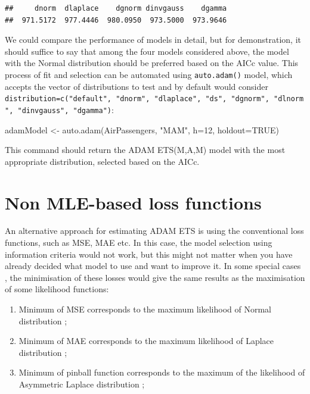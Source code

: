 \documentclass[
]{book}
\newenvironment{Shaded}{\begin{snugshade}}{\end{snugshade}}
\newcommand{\AttributeTok}[1]{\textcolor[rgb]{0.77,0.63,0.00}{#1}}
\newcommand{\ConstantTok}[1]{\textcolor[rgb]{0.00,0.00,0.00}{#1}}
\newcommand{\DecValTok}[1]{\textcolor[rgb]{0.00,0.00,0.81}{#1}}
\newcommand{\FunctionTok}[1]{\textcolor[rgb]{0.00,0.00,0.00}{#1}}
\newcommand{\NormalTok}[1]{#1}
\newcommand{\OtherTok}[1]{\textcolor[rgb]{0.56,0.35,0.01}{#1}}
\newcommand{\StringTok}[1]{\textcolor[rgb]{0.31,0.60,0.02}{#1}}
\providecommand{\tightlist}{%
  \setlength{\itemsep}{0pt}\setlength{\parskip}{0pt}}
\theoremstyle{definition}
\theoremstyle{definition}
\theoremstyle{definition}
\theoremstyle{definition}
\theoremstyle{remark}
\begin{document}
\begin{verbatim}
##     dnorm  dlaplace    dgnorm dinvgauss    dgamma 
##  971.5172  977.4446  980.0950  973.5000  973.9646
\end{verbatim}

We could compare the performance of models in detail, but for demonstration, it should suffice to say that among the four models considered above, the model with the Normal distribution should be preferred based on the AICc value. This process of fit and selection can be automated using \texttt{auto.adam()} model, which accepts the vector of distributions to test and by default would consider \texttt{distribution=c("default",\ "dnorm",\ "dlaplace",\ "ds",\ "dgnorm",\ "dlnorm",\ "dinvgauss",\ "dgamma")}:

\begin{Shaded}
\begin{Highlighting}[]
\NormalTok{adamModel }\OtherTok{\textless{}{-}} \FunctionTok{auto.adam}\NormalTok{(AirPassengers, }\StringTok{"MAM"}\NormalTok{, }\AttributeTok{h=}\DecValTok{12}\NormalTok{, }\AttributeTok{holdout=}\ConstantTok{TRUE}\NormalTok{)}
\end{Highlighting}
\end{Shaded}

This command should return the ADAM ETS(M,A,M) model with the most appropriate distribution, selected based on the AICc.

\hypertarget{non-mle-based-loss-functions}{%
\section{Non MLE-based loss functions}\label{non-mle-based-loss-functions}}

An alternative approach for estimating ADAM ETS is using the conventional loss functions, such as MSE, MAE etc. In this case, the model selection using information criteria would not work, but this might not matter when you have already decided what model to use and want to improve it. In some special cases \citep[as discussed in Chapter 3 of][]{SvetunkovSBA}, the minimisation of these losses would give the same results as the maximisation of some likelihood functions:

\begin{enumerate}
\def\labelenumi{\arabic{enumi}.}
\tightlist
\item
  Minimum of MSE corresponds to the maximum likelihood of Normal distribution \citep[see discussion in][]{Kolassa2016};
\item
  Minimum of MAE corresponds to the maximum likelihood of Laplace distribution \citep{Schwertman1990};
\item
  Minimum of pinball function \citep[quantile regression]{Koenker1978} corresponds to the maximum of the likelihood of Asymmetric Laplace distribution \citep{Yu2005};
\end{enumerate}
\end{document}
